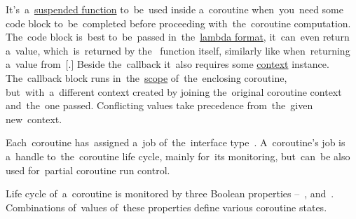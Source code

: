 It's~a~\hyperref[kotlinsuspendfunction]{suspended function} to~be~used inside a~coroutine when~you~need some code block to~be~completed before proceeding with~the~coroutine computation.
The~code block is~best to~be~passed in~the~\hyperref[kotlinlambda]{lambda format}, it~can~even return a~value, which~is~returned by the~ function itself, similarly like when~returning a~value from~[.]
Beside the~callback it~also requires some \hyperref[kotlincoroutinecontext]{context} instance.
The~callback block runs in~the~\hyperref[kotlincoroutinescope]{scope} of~the~enclosing coroutine, but~with~a~different context created by joining the~original coroutine context and~the~one passed.
Conflicting values take precedence from~the~given new~context.


\label{kotlincoroutinejob}
Each~coroutine has~assigned a~job of~the~interface type~.
A~coroutine's job is a~handle to~the~coroutine life cycle, mainly for~its monitoring, but~can~be also used for~partial coroutine run control.

Life cycle of~a~coroutine is monitored by three Boolean properties --~,  and~.
Combinations of~values of~these properties define various coroutine states.

